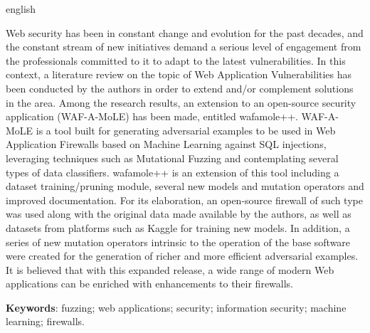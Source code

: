 \begin{resumo}[Abstract]
\begin{otherlanguage*}{english}
\begin{SingleSpace}
Web security has been in constant change and evolution for the past decades, and the constant stream of new initiatives demand a serious level of engagement from the professionals committed to it to adapt to the latest vulnerabilities. In this context, a literature review on the topic of Web Application Vulnerabilities has been conducted by the authors in order to extend and/or complement solutions in the area. Among the research results, an extension to an open-source security application (WAF-A-MoLE) has been made, entitled wafamole++. WAF-A-MoLE is a tool built for generating adversarial examples to be used in Web Application Firewalls based on Machine Learning against SQL injections, leveraging techniques such as Mutational Fuzzing and contemplating several types of data classifiers. wafamole++ is an extension of this tool including a dataset training/pruning module, several new models and mutation operators and improved documentation. For its elaboration, an open-source firewall of such type was used along with the original data made available by the authors, as well as datasets from platforms such as Kaggle for training new models. In addition, a series of new mutation operators intrinsic to the operation of the base software were created for the generation of richer and more efficient adversarial examples. It is believed that with this expanded release, a wide range of modern Web applications can be enriched with enhancements to their firewalls.
\end{SingleSpace}


\vspace{\onelineskip}
   \textbf{Keywords}: fuzzing; web applications; security; information security; machine learning; firewalls.
   
 \end{otherlanguage*}
\end{resumo}




  
